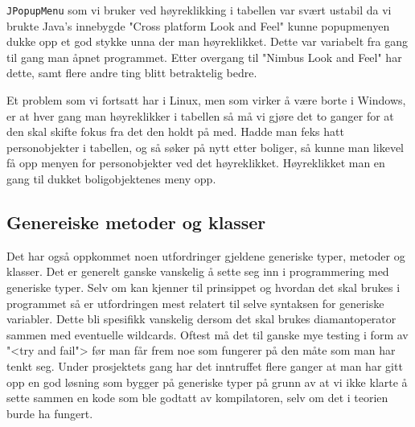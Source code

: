 \texttt{JPopupMenu} som vi bruker ved høyreklikking i tabellen var svært ustabil da vi brukte Java's innebygde "Cross platform Look and Feel" kunne popupmenyen dukke opp et god stykke unna der man høyreklikket. Dette var variabelt fra gang til gang man åpnet programmet. Etter overgang til "Nimbus Look and Feel" har dette, samt flere andre ting blitt betraktelig bedre.

Et problem som vi fortsatt har i Linux, men som virker å være borte i Windows, er at hver gang man høyreklikker i tabellen så må vi gjøre det to ganger for at den skal skifte fokus fra det den holdt på med. Hadde man feks hatt personobjekter i tabellen, og så søker på nytt etter boliger, så kunne man likevel få opp menyen for personobjekter ved det høyreklikket. Høyreklikket man en gang til dukket boligobjektenes meny opp.

\subsection{Genereiske metoder og klasser}
Det har også oppkommet noen utfordringer gjeldene generiske typer, metoder og klasser. Det er generelt ganske vanskelig å sette seg inn i programmering med generiske typer. Selv om kan kjenner til prinsippet og hvordan det skal brukes i programmet så er utfordringen mest relatert til selve syntaksen for generiske variabler. Dette bli spesifikk vanskelig dersom det skal brukes diamantoperator sammen med eventuelle wildcards. Oftest må det til ganske mye testing i form av "<try and fail"> før man får frem noe som fungerer på den måte som man har tenkt seg. Under prosjektets gang har det inntruffet flere ganger at man har gitt opp en god løsning som bygger på generiske typer på grunn av at vi ikke klarte å sette sammen en kode som ble godtatt av kompilatoren, selv om det i teorien burde ha fungert.